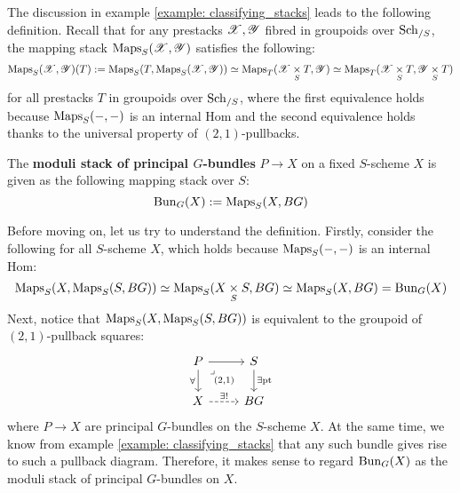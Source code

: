             The discussion in example \ref{example: classifying_stacks} leads to the following definition. Recall that for any prestacks $\mathscr{X}, \mathscr{Y}$ fibred in groupoids over $\mathrm{Sch}_{/S}$, the mapping stack $\mathrm{Maps}_S(\mathscr{X}, \mathscr{Y})$ satisfies the following:
                $$\Maps_S(\scrX, \scrY)(T) := \Maps_S( T, \Maps_S(\scrX, \scrY) ) \cong \Maps_T(\scrX \x_S T, \scrY) \cong \Maps_T(\scrX \x_S T, \scrY \x_S T)$$
            for all prestacks $T$ in groupoids over $\mathrm{Sch}_{/S}$, where the first equivalence holds because $\mathrm{Maps}_S(-, -)$ is an internal Hom and the second equivalence holds thanks to the universal property of $(2, 1)$-pullbacks.
            \begin{definition} \label{def: moduli_stack_of_principal_bundles}
                The \textbf{moduli stack of principal $G$-bundles} $P \to X$ on a fixed $S$-scheme $X$ is given as the following mapping stack over $S$:
                    $$\mathrm{Bun}_G(X) := \mathrm{Maps}_S( X, BG )$$
            \end{definition}
            
            Before moving on, let us try to understand the definition. Firstly, consider the following for all $S$-scheme $X$, which holds because $\mathrm{Maps}_S(-, -)$ is an internal Hom:
                $$\Maps_S( X, \Maps_S( S, BG ) ) \cong \Maps_S( X \x_S S, BG ) \cong \Maps_S( X, BG ) = \Bun_G(X)$$
            Next, notice that $\mathrm{Maps}_S( X, \mathrm{Maps}_S( S, BG )  )$ is equivalent to the groupoid of $(2, 1)$-pullback squares:
                $$
                    \begin{tikzcd}
                        P & S \\
                        X & BG
                        \arrow[from=1-1, to=1-2]
                        \arrow["\forall"', from=1-1, to=2-1]
                        \arrow["{(2, 1)}"{description}, "\lrcorner"{anchor=center, pos=0.125}, draw=none, from=1-1, to=2-2]
                        \arrow["\exists \pt", from=1-2, to=2-2]
                        \arrow["{\exists!}", dashed, from=2-1, to=2-2]
                    \end{tikzcd}
                $$
            where $P \to X$ are principal $G$-bundles on the $S$-scheme $X$. At the same time, we know from example \ref{example: classifying_stacks} that any such bundle gives rise to such a pullback diagram. Therefore, it makes sense to regard $\mathrm{Bun}_G(X)$ as the moduli stack of principal $G$-bundles on $X$.
            
